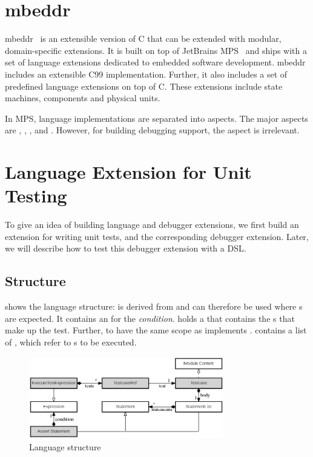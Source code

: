 \section{mbeddr}

mbeddr~\cite{Voelter:2012:MEC:2384716.2384767} is an extensible version of C
that can be extended with modular, domain-specific extensions. 
It is built on top of JetBrains \ac{MPS}~\cite{2012_mps_homepage}
and ships with a set of language extensions dedicated to embedded software
development. mbeddr includes an extensible C99 implementation. Further, 
it also includes a set of predefined language extensions on top of C. These 
extensions include state machines, components and physical units.

In \ac{MPS}, language implementations are separated into aspects. 
The major aspects  are , 
, ,  and . However, for
building debugging support, the  aspect is irrelevant.

\section{Language Extension for Unit Testing}

To give an idea of building language and debugger extensions, we first 
build an extension for writing 
unit tests, and the corresponding debugger extension. Later,
we will describe how to test this debugger extension with a \ac{DSL}. 

\subsection{Structure}

 shows the language structure:
 is derived from  and can therefore
be used where s are expected. It contains an 
for the \emph{condition}.
 holds a  that contains the s
that make up the test. Further, to have the same scope as 
 implements .
 contains a list of
, which refer to s to be executed.

\begin{figure}[h]
  \vspace{-3mm}
  \centering
    \includegraphics[width=8.5cm]{./figures/unitTestingLangUML2.png} 
    \vspace{-3mm} 
    \caption{Language structure}
  \label{fig:UnitTestStructure}
  \vspace{-5mm}
\end{figure}

